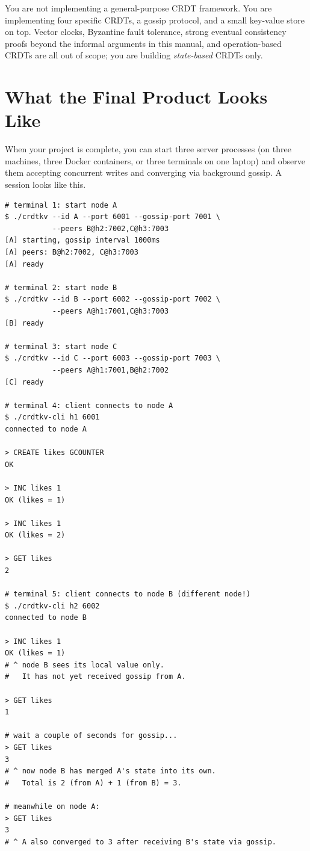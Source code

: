 \documentclass[11pt,a4paper]{article}
\begin{document}
You are not implementing a general-purpose CRDT framework. You are implementing four specific CRDTs, a gossip protocol, and a small key-value store on top. Vector clocks, Byzantine fault tolerance, strong eventual consistency proofs beyond the informal arguments in this manual, and operation-based CRDTs are all out of scope; you are building \textit{state-based} CRDTs only.

\section{What the Final Product Looks Like}

When your project is complete, you can start three server processes (on three machines, three Docker containers, or three terminals on one laptop) and observe them accepting concurrent writes and converging via background gossip. A session looks like this.

\begin{codebox}
\begin{lstlisting}
# terminal 1: start node A
$ ./crdtkv --id A --port 6001 --gossip-port 7001 \
           --peers B@h2:7002,C@h3:7003
[A] starting, gossip interval 1000ms
[A] peers: B@h2:7002, C@h3:7003
[A] ready

# terminal 2: start node B
$ ./crdtkv --id B --port 6002 --gossip-port 7002 \
           --peers A@h1:7001,C@h3:7003
[B] ready

# terminal 3: start node C
$ ./crdtkv --id C --port 6003 --gossip-port 7003 \
           --peers A@h1:7001,B@h2:7002
[C] ready

# terminal 4: client connects to node A
$ ./crdtkv-cli h1 6001
connected to node A

> CREATE likes GCOUNTER
OK

> INC likes 1
OK (likes = 1)

> INC likes 1
OK (likes = 2)

> GET likes
2

# terminal 5: client connects to node B (different node!)
$ ./crdtkv-cli h2 6002
connected to node B

> INC likes 1
OK (likes = 1)
# ^ node B sees its local value only.
#   It has not yet received gossip from A.

> GET likes
1

# wait a couple of seconds for gossip...
> GET likes
3
# ^ now node B has merged A's state into its own.
#   Total is 2 (from A) + 1 (from B) = 3.

# meanwhile on node A:
> GET likes
3
# ^ A also converged to 3 after receiving B's state via gossip.
\end{lstlisting}
\end{codebox}
\end{document}
